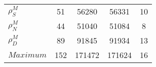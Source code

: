 \begin{center}
\begin{longtable}{lcccc}
$ {\rho^{M}_{S}}       $	 & 	                   51	 & 	                56280	 & 	                56331	 & 	                   10 \\ 
$ {\rho^{M}_{N}}       $	 & 	                   44	 & 	                51040	 & 	                51084	 & 	                    8 \\ 
$ {\rho^{M}_{D}}       $	 & 	                   89	 & 	                91845	 & 	                91934	 & 	                   13 \\ 
$Maximum               $	 & 	                  152	 & 	               171472	 & 	               171624	 & 	                   16 \\ 
\end{longtable}
 \end{center}
